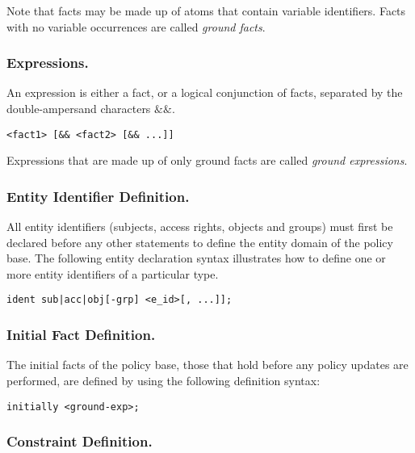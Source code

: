 \documentclass{llncs}
\begin{document}
        Note that facts may be made up of atoms that contain variable
        identifiers. Facts with no variable occurrences are called {\em ground
        facts}.

      \subsubsection{Expressions.}

        An expression is either a fact, or a logical conjunction of facts,
        separated by the double-ampersand characters $\&\&$.

        \begin{verbatim}<fact1> [&& <fact2> [&& ...]]\end{verbatim}

        Expressions that are made up of only ground facts are called
        {\em ground expressions}.

      \subsubsection{Entity Identifier Definition.}

        All entity identifiers (subjects, access rights, objects and groups)
        must first be declared before any other statements to define the
        entity domain of the policy base. The following entity declaration
        syntax illustrates how to define one or more entity identifiers of a
        particular type.

        \begin{verbatim}ident sub|acc|obj[-grp] <e_id>[, ...]];\end{verbatim}

      \subsubsection{Initial Fact Definition.}

        The initial facts of the policy base, those that hold before any
        policy updates are performed, are defined by using the following
        definition syntax:

        \begin{verbatim}initially <ground-exp>;\end{verbatim}

      \subsubsection{Constraint Definition.}
\end{document}
